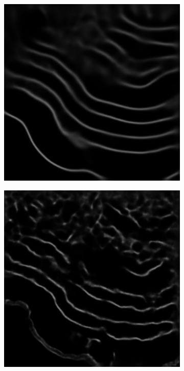 \begin{figure}[!t]
\begin{subfigure}[t]{0.24\textwidth}
        \includegraphics[width=1\textwidth, valign=c]{images/abl-forward.png}
        \caption{}
    \end{subfigure}
    \begin{subfigure}[t]{0.24\textwidth}
        \centering
        \includegraphics[width=1\textwidth, valign=c]{images/abl-short.png}

\end{subfigure}
\end{figure}
